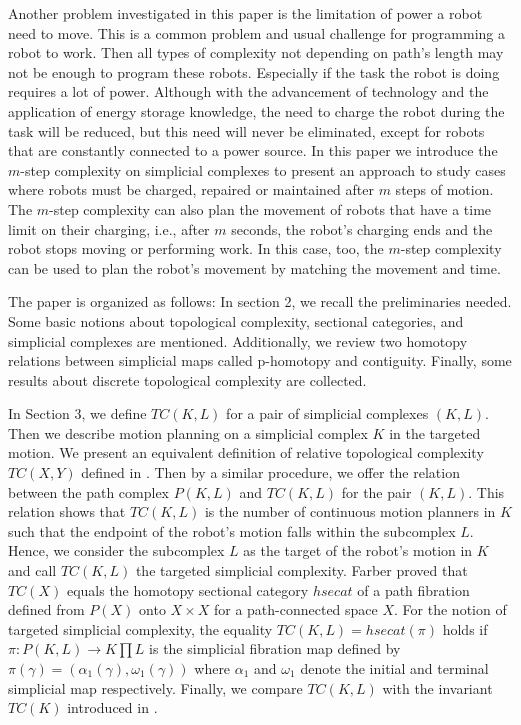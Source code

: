 \documentclass[preprint,11pt %
]{hjm1}
\theoremstyle{definition}
\begin{document}
Another problem investigated in this paper is the limitation of power a robot need to move.
This is a common problem and usual challenge for programming a robot to work. Then all types of complexity not depending on path's length may not be enough to program these robots. Especially if the task the robot is doing requires a lot of power. Although with the advancement of technology and the application of energy storage knowledge, the need to charge the robot during the task will be reduced, but this need will never be eliminated, except for robots that are constantly connected to a power source. 
In this paper we introduce the $m$-step complexity on simplicial complexes to present an approach to study  cases where robots must be charged,  repaired or maintained after $m$ steps of motion.
The $m$-step complexity can also plan the movement of robots that have a time limit on their charging, i.e., after $m$ seconds, the robot's charging ends and the robot stops moving or performing work. In this case, too, the  $m$-step complexity can be used to plan the robot's movement by matching the movement and time.




The paper is organized as follows: In section 2, 
we recall the preliminaries needed. Some basic notions about topological complexity, sectional categories, and simplicial complexes are mentioned. Additionally, we review two homotopy relations between simplicial maps called p-homotopy and contiguity. Finally, some results about discrete topological complexity are collected.

In Section 3, we define $TC(K,L)$ for a pair of simplicial complexes $(K, L)$. 
Then we describe motion planning on a simplicial complex $K$ in the targeted motion. We present an equivalent definition of relative topological complexity $TC(X,Y)$ defined in \cite{rel}. 
Then by a similar procedure, we offer the relation between the path complex $P(K,L)$ and $TC(K,L)$ for the pair $(K,L)$. 
This relation shows that $TC(K,L)$ is the number of continuous motion planners in $K$ such that the endpoint of the robot's motion falls within the subcomplex $L$. Hence, we consider the subcomplex $L$ as the target of the robot's motion in $K$ and call $TC(K,L)$ the targeted simplicial complexity.
 Farber \cite{Far} proved that $TC(X)$ equals the homotopy sectional category $hsecat$ of a path fibration defined from $P(X)$ onto $X \times X$ for a path-connected space $X$. 
For the notion of targeted simplicial complexity, the equality $TC(K,L)=hsecat(\pi)$ holds if $\pi :P(K,L)\to K\prod  L$ is the simplicial fibration map defined by $\pi (\gamma )=(\alpha_1 (\gamma ), \omega_1 (\gamma ))$ where $\alpha_1$ and $\omega_1$ denote the initial and terminal simplicial map respectively. Finally, we compare $TC(K,L)$ with the invariant $TC(K)$ introduced in \cite{dis}.
\end{document}

